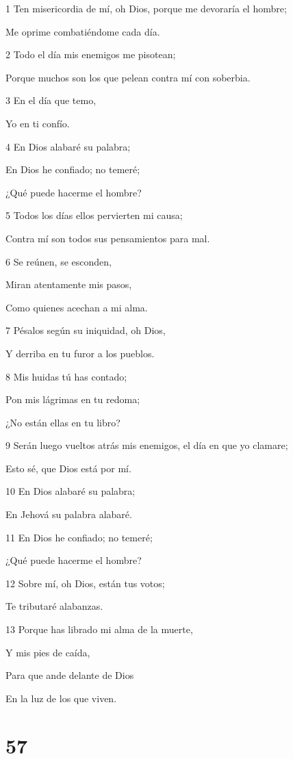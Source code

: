 \par 1 Ten misericordia de mí, oh Dios, porque me devoraría el hombre;
\par Me oprime combatiéndome cada día.
\par 2 Todo el día mis enemigos me pisotean;
\par Porque muchos son los que pelean contra mí con soberbia.
\par 3 En el día que temo,
\par Yo en ti confío.
\par 4 En Dios alabaré su palabra;
\par En Dios he confiado; no temeré;
\par ¿Qué puede hacerme el hombre?
\par 5 Todos los días ellos pervierten mi causa;
\par Contra mí son todos sus pensamientos para mal.
\par 6 Se reúnen, se esconden,
\par Miran atentamente mis pasos,
\par Como quienes acechan a mi alma.
\par 7 Pésalos según su iniquidad, oh Dios,
\par Y derriba en tu furor a los pueblos.
\par 8 Mis huidas tú has contado;
\par Pon mis lágrimas en tu redoma;
\par ¿No están ellas en tu libro?
\par 9 Serán luego vueltos atrás mis enemigos, el día en que yo clamare;
\par Esto sé, que Dios está por mí.
\par 10 En Dios alabaré su palabra;
\par En Jehová su palabra alabaré.
\par 11 En Dios he confiado; no temeré;
\par ¿Qué puede hacerme el hombre?
\par 12 Sobre mí, oh Dios, están tus votos;
\par Te tributaré alabanzas.
\par 13 Porque has librado mi alma de la muerte,
\par Y mis pies de caída,
\par Para que ande delante de Dios
\par En la luz de los que viven.

\chapter{57}

